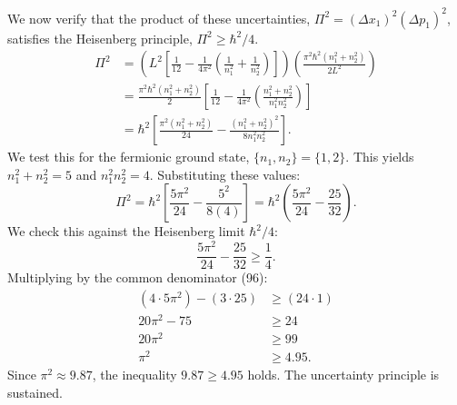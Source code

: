 We now verify that the product of these uncertainties,
$\Pi^2 = (\Delta x_1)^2 (\Delta p_1)^2$,
satisfies the Heisenberg principle, $\Pi^2 \ge \hbar^2/4$.
\begin{align}
  \Pi^2 &= \left( L^2 \left[ \frac{1}{12} - \frac{1}{4\pi^2}
    \left( \frac{1}{n_1^2} + \frac{1}{n_2^2} \right) \right] \right)
    \left( \frac{\pi^2 \hbar^2 (n_1^2 + n_2^2)}{2L^2} \right) \nonumber \\
  &= \frac{\pi^2 \hbar^2 (n_1^2 + n_2^2)}{2}
    \left[ \frac{1}{12} - \frac{1}{4\pi^2}
    \left( \frac{n_1^2 + n_2^2}{n_1^2 n_2^2} \right) \right] \nonumber \\
  &= \hbar^2 \left[ \frac{\pi^2 (n_1^2 + n_2^2)}{24} -
    \frac{(n_1^2 + n_2^2)^2}{8 n_1^2 n_2^2} \right].
\end{align}
We test this for the fermionic ground state,
$\{n_1, n_2\} = \{1, 2\}$. This yields $n_1^2 + n_2^2 = 5$
and $n_1^2 n_2^2 = 4$. Substituting these values:
\begin{equation}
  \Pi^2 = \hbar^2 \left[ \frac{5\pi^2}{24} - \frac{5^2}{8(4)} \right]
  = \hbar^2 \left( \frac{5\pi^2}{24} - \frac{25}{32} \right).
\end{equation}
We check this against the Heisenberg limit $\hbar^2/4$:
\begin{equation}
  \frac{5\pi^2}{24} - \frac{25}{32} \ge \frac{1}{4}.
\end{equation}
Multiplying by the common denominator (96):
\begin{align*}
  (4 \cdot 5\pi^2) - (3 \cdot 25) &\ge (24 \cdot 1) \\
  20\pi^2 - 75 &\ge 24 \\
  20\pi^2 &\ge 99 \\
  \pi^2 &\ge 4.95.
\end{align*}
Since $\pi^2 \approx 9.87$, the inequality $9.87 \ge 4.95$ holds.
The uncertainty principle is sustained.
